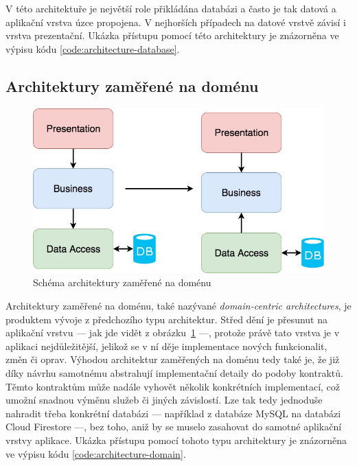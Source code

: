 V této architektuře je největší role přikládána databázi
a často je tak datová a aplikační vrstva úzce propojena.
V nejhorších případech na datové vrstvě závisí i vrstva prezentační.
\cite{architecture}
Ukázka přístupu pomocí této architektury je znázorněna ve výpisu kódu
\ref{code:architecture-database}.

\subsection{Architektury zaměřené na doménu}

\begin{figure}
    \centering
    \includegraphics[width=0.5\linewidth]{assets/technology-research/architecture/domain-centric.jpeg}
    \caption{Schéma architektury zaměřené na doménu ~\cite{architecture}}
    \label{fig:architecture_domain}
\end{figure}

Architektury zaměřené na doménu,
také nazývané \emph{domain-centric architectures},
je produktem vývoje z předchozího typu architektur.
Střed dění je přesunut na aplikační vrstvu
--- jak jde vidět z obrázku~\ref{fig:architecture_domain} ---,
protože právě tato vrstva je v aplikaci nejdůležitější,
jelikož se v ní děje implementace nových funkcionalit, změn či oprav.
\cite{architecture}
\cite{martin_clean_architecture}
Výhodou architektur zaměřených na doménu tedy také je,
že již díky návrhu samotnému abstrahují implementační detaily do podoby
kontraktů.
Těmto kontraktům může nadále vyhovět několik konkrétních implementací,
což umožní snadnou výměnu služeb či jiných závislostí.
\cite{martin_clean_architecture}
Lze tak tedy jednoduše nahradit třeba konkrétní databázi
--- například z databáze MySQL na databázi Cloud Firestore ---,
bez toho,
aniž by se muselo zasahovat do samotné aplikační vrstvy aplikace.
Ukázka přístupu pomocí tohoto typu architektury je znázorněna ve výpisu kódu
\ref{code:architecture-domain}.

